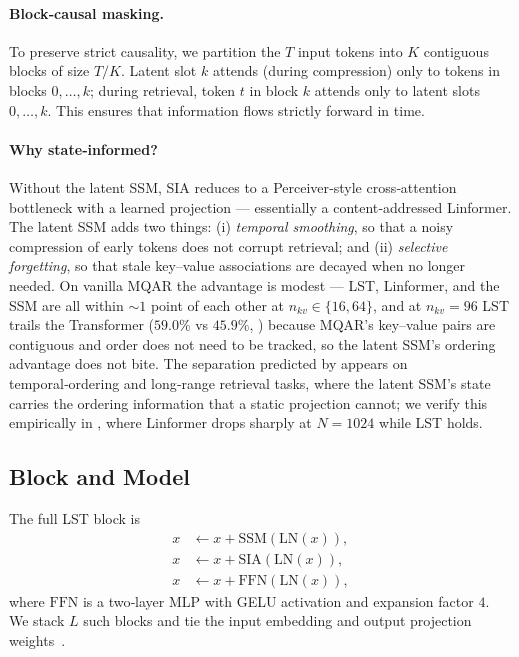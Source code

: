 \documentclass[10pt,twocolumn,letterpaper]{article}
\newcommand{\LST}{\textsc{LST}}
\newcommand{\SIA}{\textsc{SIA}}
\begin{document}
\paragraph{Block‑causal masking.}  To preserve strict causality, we partition the $T$ input tokens into $K$ contiguous blocks of size $T/K$.  Latent slot $k$ attends (during compression) only to tokens in blocks $0,\dots,k$; during retrieval, token $t$ in block $k$ attends only to latent slots $0,\dots,k$.  This ensures that information flows strictly forward in time.

\paragraph{Why state‑informed?}  Without the latent SSM, \SIA{} reduces to a Perceiver‑style cross‑attention bottleneck with a learned projection — essentially a content‑addressed Linformer.  The latent SSM adds two things: (i) \emph{temporal smoothing}, so that a noisy compression of early tokens does not corrupt retrieval; and (ii) \emph{selective forgetting}, so that stale key–value associations are decayed when no longer needed.  On vanilla MQAR the advantage is modest --- \LST{}, Linformer, and the SSM are all within $\sim\!1$ point of each other at $n_{kv}\!\in\!\{16,64\}$, and at $n_{kv}\!=\!96$ \LST{} trails the Transformer ($59.0\%$ vs $45.9\%$, ) because MQAR's key–value pairs are contiguous and order does not need to be tracked, so the latent SSM's ordering advantage does not bite.  The separation predicted by  appears on temporal‑ordering and long‑range retrieval tasks, where the latent SSM's state carries the ordering information that a static projection cannot; we verify this empirically in , where Linformer drops sharply at $N\!=\!1024$ while \LST{} holds.

\subsection{Block and Model}
\label{sec:block}

The full \LST{} block is
\begin{align}
    x &\leftarrow x + \mathrm{SSM}(\mathrm{LN}(x)), \\
    x &\leftarrow x + \mathrm{SIA}(\mathrm{LN}(x)), \\
    x &\leftarrow x + \mathrm{FFN}(\mathrm{LN}(x)),
\end{align}
where $\mathrm{FFN}$ is a two‑layer MLP with GELU activation and expansion factor $4$.  We stack $L$ such blocks and tie the input embedding and output projection weights~\cite{press2017using}.
\end{document}
